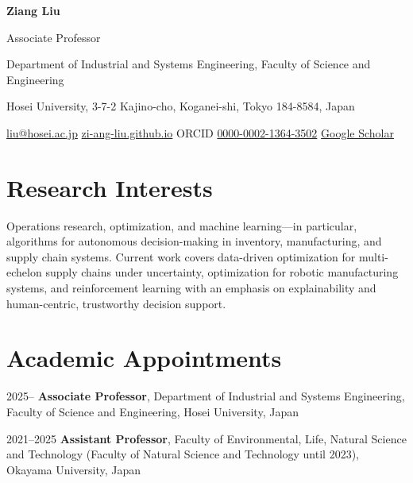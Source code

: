 \documentclass[11pt,a4paper]{article}
\newcommand{\hlink}[2]{\href{#1}{\textcolor{accent}{#2}}}
\newlength{\datecol}
\newenvironment{cvlist}{%
  \begin{list}{}{%
    \setlength{\leftmargin}{\datecol}%
    \setlength{\labelwidth}{\datecol}%
    \setlength{\labelsep}{0pt}%
    \setlength{\itemsep}{3pt}%
    \setlength{\parsep}{0pt}%
    \setlength{\topsep}{2pt}%
    \renewcommand{\makelabel}[1]{##1\hfil}}%
  \raggedright}%
  {\end{list}}
\begin{document}
{\fontsize{24}{28}\selectfont\bfseries Ziang Liu}\par
\vspace{6pt}
{\large Associate Professor}\par
\vspace{2pt}
Department of Industrial and Systems Engineering, Faculty of Science and Engineering\par
Hosei University, 3-7-2 Kajino-cho, Koganei-shi, Tokyo 184-8584, Japan\par
\vspace{6pt}
{\small
\hlink{mailto:liu@hosei.ac.jp}{liu@hosei.ac.jp}\quad\textperiodcentered\quad
\hlink{https://zi-ang-liu.github.io}{zi-ang-liu.github.io}\quad\textperiodcentered\quad
ORCID \hlink{https://orcid.org/0000-0002-1364-3502}{0000-0002-1364-3502}\quad\textperiodcentered\quad
\hlink{https://scholar.google.com/citations?user=dRuC1OoAAAAJ}{Google Scholar}\par}

\section{Research Interests}

\begin{cvlist}
\item[] Operations research, optimization, and machine learning---in
particular, algorithms for autonomous decision-making in inventory,
manufacturing, and supply chain systems. Current work covers data-driven
optimization for multi-echelon supply chains under uncertainty, optimization for
robotic manufacturing systems, and reinforcement learning with an emphasis on
explainability and human-centric, trustworthy decision support.
\end{cvlist}

\section{Academic Appointments}

\begin{cvlist}
\item[2025--] \textbf{Associate Professor}, Department of Industrial and Systems
  Engineering, Faculty of Science and Engineering, Hosei University, Japan
\item[2021--2025] \textbf{Assistant Professor}, Faculty of Environmental, Life,
  Natural Science and Technology (Faculty of Natural Science and Technology
  until 2023), Okayama University, Japan
\end{cvlist}
\end{document}
